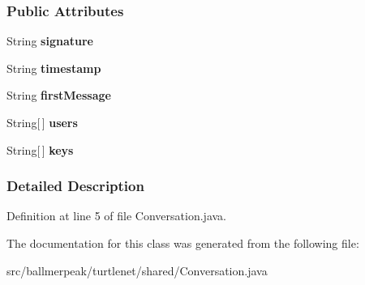 \subsubsection*{Public Attributes}
\begin{DoxyCompactItemize}
\item 
\hypertarget{classballmerpeak_1_1turtlenet_1_1shared_1_1Conversation_a27bf5eadc5e4a46d79125a2c6b7be9f8}{String {\bfseries signature}}\label{classballmerpeak_1_1turtlenet_1_1shared_1_1Conversation_a27bf5eadc5e4a46d79125a2c6b7be9f8}

\item 
\hypertarget{classballmerpeak_1_1turtlenet_1_1shared_1_1Conversation_a4b23ef60e0fef247b74eeba61a85036f}{String {\bfseries timestamp}}\label{classballmerpeak_1_1turtlenet_1_1shared_1_1Conversation_a4b23ef60e0fef247b74eeba61a85036f}

\item 
\hypertarget{classballmerpeak_1_1turtlenet_1_1shared_1_1Conversation_a3529815cfaa34a63e188ff968c54a70c}{String {\bfseries first\-Message}}\label{classballmerpeak_1_1turtlenet_1_1shared_1_1Conversation_a3529815cfaa34a63e188ff968c54a70c}

\item 
\hypertarget{classballmerpeak_1_1turtlenet_1_1shared_1_1Conversation_a83edd678b2620b5487fb9a93d52b285e}{String\mbox{[}$\,$\mbox{]} {\bfseries users}}\label{classballmerpeak_1_1turtlenet_1_1shared_1_1Conversation_a83edd678b2620b5487fb9a93d52b285e}

\item 
\hypertarget{classballmerpeak_1_1turtlenet_1_1shared_1_1Conversation_af74acc5c9a1d9275fc452171952707f0}{String\mbox{[}$\,$\mbox{]} {\bfseries keys}}\label{classballmerpeak_1_1turtlenet_1_1shared_1_1Conversation_af74acc5c9a1d9275fc452171952707f0}

\end{DoxyCompactItemize}


\subsubsection{Detailed Description}


Definition at line 5 of file Conversation.\-java.



The documentation for this class was generated from the following file\-:\begin{DoxyCompactItemize}
\item 
src/ballmerpeak/turtlenet/shared/Conversation.\-java\end{DoxyCompactItemize}
